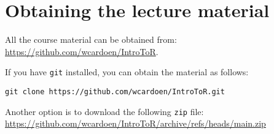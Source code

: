 

\section{Obtaining the lecture material}
All the course material can be obtained from: \href{https://github.com/wcardoen/IntroToR}{https://github.com/wcardoen/IntroToR}.

If you have \texttt{git} installed, you can obtain the material as follows:
\begin{verbatim}
git clone https://github.com/wcardoen/IntroToR.git
\end{verbatim}
Another option is to download the following \texttt{zip} file: \newline 
\href{https://github.com/wcardoen/IntroToR/archive/refs/heads/main.zip}{https://github.com/wcardoen/IntroToR/archive/refs/heads/main.zip}


